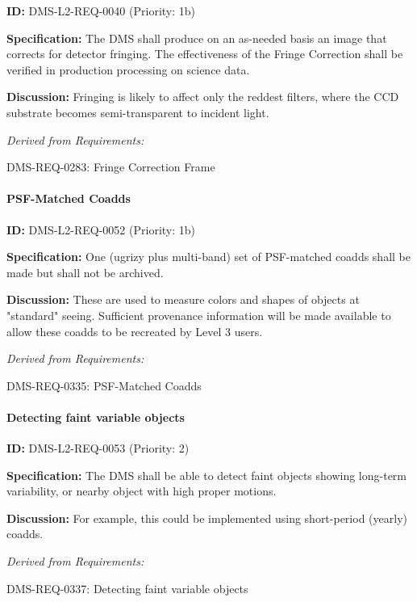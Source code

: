 \documentclass[SE,toc,lsstdraft]{lsstdoc}
\begin{document}
\label{DMS-L2-REQ-0040}
\textbf{ID:} DMS-L2-REQ-0040 (Priority: 1b)

\textbf{Specification:} The DMS shall produce on an as-needed basis an image that corrects for detector fringing. The effectiveness of the Fringe Correction shall be verified in production processing on science data.

\textbf{Discussion: }Fringing is likely to affect only the reddest filters, where the CCD substrate becomes semi-transparent to incident light.

\emph{Derived from Requirements:}

DMS-REQ-0283:
Fringe Correction Frame \newline

\paragraph{PSF-Matched Coadds}\hfill  %

\label{DMS-L2-REQ-0052}
\textbf{ID:} DMS-L2-REQ-0052 (Priority: 1b)

\textbf{Specification:} One (ugrizy plus multi-band) set of PSF-matched coadds shall be made but shall not be archived.

\textbf{Discussion:} These are used to measure colors and shapes of objects at "standard" seeing. Sufficient provenance information will be made available to allow these coadds to be recreated by Level 3 users.

\emph{Derived from Requirements:}

DMS-REQ-0335:
PSF-Matched Coadds \newline

\paragraph{Detecting faint variable objects}\hfill  %

\label{DMS-L2-REQ-0053}
\textbf{ID:} DMS-L2-REQ-0053 (Priority: 2)

\textbf{Specification: }The DMS shall be able to detect faint objects showing long-term variability, or nearby object with high proper motions.

\textbf{Discussion:} For example, this could be implemented using short-period (yearly) coadds.

\emph{Derived from Requirements:}

DMS-REQ-0337:
Detecting faint variable objects \newline
\end{document}
